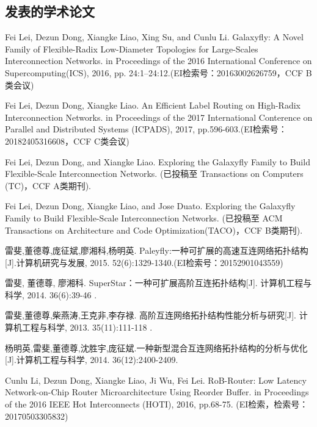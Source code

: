\begin{resume}

  \section*{发表的学术论文} %

  \begin{enumerate}[{[}1{]}]
  \addtolength{\itemsep}{-.36\baselineskip}%
  \item Fei Lei, Dezun Dong, Xiangke Liao, Xing Su, and Cunlu Li. Galaxyfly: A Novel Family of Flexible-Radix Low-Diameter Topologies for Large-Scales Interconnection Networks. in Proceedings of the 2016 International Conference on Supercomputing(ICS), 2016, pp. 24:1–24:12.(EI检索号：20163002626759，CCF B类会议)
  \item Fei Lei, Dezun Dong, Xiangke Liao. An Efficient Label Routing on High-Radix Interconnection Networks. in Proceedings of the 2017 International Conterence on Parallel and Distributed Systems (ICPADS), 2017, pp.596-603.(EI检索号：20182405316608，CCF C类会议)
   \item Fei Lei, Dezun Dong, and Xiangke Liao. Exploring the Galaxyfly Family to Build Flexible-Scale Interconnection Networks. (已投稿至 Transactions on Computers (TC)，CCF A类期刊).
   \item Fei Lei, Dezun Dong, Xiangke Liao, and Jose Duato. Exploring the Galaxyfly Family to Build Flexible-Scale Interconnection Networks. (已投稿至 ACM Transactions on Architecture and Code Optimization(TACO)，CCF B类期刊).
  \item 雷斐,董德尊,庞征斌,廖湘科,杨明英. Paleyfly:一种可扩展的高速互连网络拓扑结构[J].计算机研究与发展, 2015. 52(6):1329-1340.(EI检索号：20152901043559)
  \item 雷斐, 董德尊, 廖湘科. SuperStar：一种可扩展高阶互连拓扑结构[J]. 计算机工程与科学, 2014. 36(6):39-46 .
  \item 雷斐,董德尊,柴燕涛,王克非,李存禄. 高阶互连网络拓扑结构性能分析与研究[J]. 计算机工程与科学, 2013. 35(11):111-118 .
  \item 杨明英,雷斐,董德尊,沈胜宇,庞征斌.一种新型混合互连网络拓扑结构的分析与优化[J].计算机工程与科学, 2014. 36(12):2400-2409.
  \item Cunlu Li, Dezun Dong, Xiangke Liao, Ji Wu, Fei Lei. RoB-Router: Low Latency Network-on-Chip Router Microarchitecture Using Reorder Buffer. in Proceedings of the 2016 IEEE Hot Interconnects (HOTI), 2016, pp.68-75. (EI检索，检索号：20170503305832)

\end{enumerate}
\end{resume}
